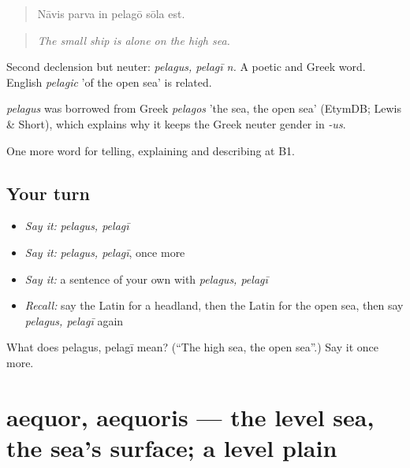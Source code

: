 \begin{quote}
Nāvis parva in pelagō sōla est.
\end{quote}

\begin{quote}
\emph{The small ship is alone on the high sea.}
\end{quote}

Second declension but neuter: \emph{pelagus, pelagī n.} A poetic and Greek word. English \emph{pelagic} 'of the open sea' is related.

\begin{cousinweb}
\emph{pelagus} was borrowed from Greek \emph{pelagos} 'the sea, the open sea' (EtymDB; Lewis \& Short), which explains why it keeps the Greek neuter gender in \emph{-us}.
\end{cousinweb}

\begin{grammarlens}[title={What you've built}]
One more word for telling, explaining and describing at B1.
\end{grammarlens}

\subsection*{Your turn}
\begin{itemize}
\raggedright
  \item \emph{Say it:} \emph{pelagus, pelagī}
  \item \emph{Say it:} \emph{pelagus, pelagī}, once more
  \item \emph{Say it:} a sentence of your own with \emph{pelagus, pelagī}
  \item \emph{Recall:} say the Latin for a headland, then the Latin for the open sea, then say \emph{pelagus, pelagī} again
\end{itemize}

\begin{tcolorbox}[breakable,colback=teal!4,colframe=teal!35!black,title={Before you move on}]
What does pelagus, pelagī mean? (\textquotedblleft{}The high sea, the open sea\textquotedblright{}.) Say it once more.
\end{tcolorbox}
\section[aequor, aequoris]{aequor, aequoris — the level sea, the sea's surface; a level plain}

\label{lesson:LA-C442-aequor}



